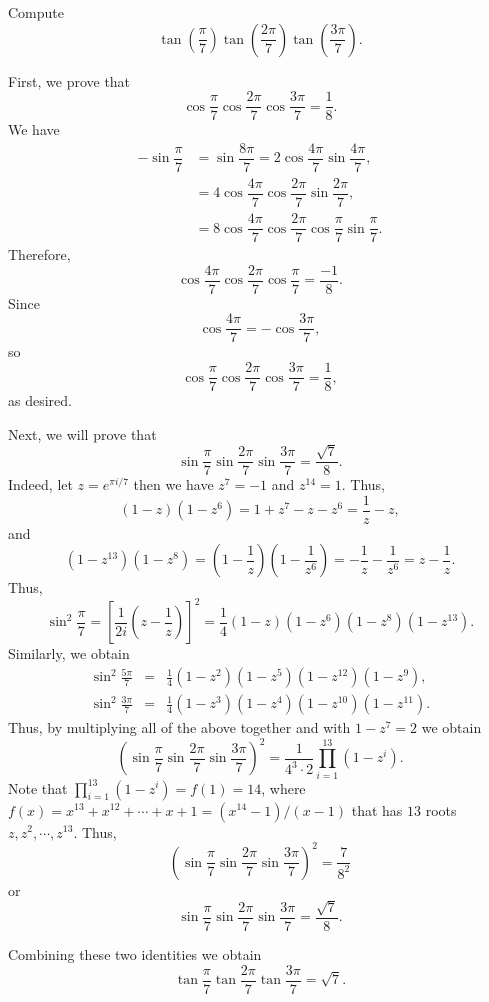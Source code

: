\documentclass[11pt]{article}
\theoremstyle{definition}
\begin{document}
%	








\begin{question}[name={2016 HMMT, Guts, \href{https://artofproblemsolving.com/community/c129h1359338p7444611}{Problem 15}}]
	Compute $$\tan\left(\frac{\pi}{7}\right)\tan\left(\frac{2\pi}{7}\right)\tan\left(\frac{3\pi}{7}\right).$$
\end{question}





\begin{solution}[name={Solution by shinichiman}]
	First, we prove that $$\cos \dfrac{\pi}{7} \cos \dfrac{2\pi}{7} \cos \dfrac{3\pi}{7}= \frac{1}{8}.$$ We have
	\begin{align*} -\sin \dfrac{\pi}{7} & = \sin \dfrac{8\pi}{7}= 2\cos \dfrac{4\pi}{7} \sin \dfrac{4\pi}{7}, \\
		& = 4 \cos \dfrac{4\pi}{7} \cos \dfrac{2\pi}{7} \sin \dfrac{2\pi}{7}, \\
		& = 8 \cos \dfrac{4\pi}{7} \cos \dfrac{2\pi}{7} \cos \dfrac{\pi}{7} \sin \dfrac{\pi}{7}. \end{align*}
	Therefore, $$\cos \dfrac{4\pi}{7} \cos \dfrac{2\pi}{7} \cos \dfrac{\pi}{7}= \dfrac{-1}{8}.$$ Since $$\cos \frac{4\pi}{7}= - \cos \dfrac{3\pi}{7},$$ so $$\cos \dfrac{\pi}{7} \cos \dfrac{2\pi}{7} \cos \dfrac{3\pi}{7}= \frac{1}{8},$$ as desired.
	
	
	Next, we will prove that $$\sin \frac{\pi}{7} \sin \frac{2\pi}{7} \sin \frac{3\pi}{7}= \frac{\sqrt{7}}{8}.$$ Indeed, let $z= e^{\pi i/7}$ then we have $z^7=-1$ and $z^{14}=1$. Thus, $$(1-z)(1-z^6)=1+z^7-z-z^6= \frac{1}{z}-z,$$ and $$(1-z^{13})(1-z^8)=\left(1- \frac 1z \right) \left(1- \frac{1}{z^6} \right)=-\frac{1}{z}- \frac{1}{z^6}=z- \frac{1}{z}.$$ Thus, $$\sin^2 \frac{\pi}{7}= \left[ \frac{1}{2i} \left(z- \frac{1}{z} \right) \right]^2=\frac 14(1-z)(1-z^6)(1-z^8)(1-z^{13}).$$Similarly, we obtain
	\begin{eqnarray*} \sin^2 \frac{5\pi}{7} & = & \frac 14 (1-z^2)(1-z^5)(1-z^{12})(1-z^{9}), \\
		\sin^2 \frac{3\pi}{7} & =& \frac 14 (1-z^3)(1-z^4)(1-z^{10})(1-z^{11}).
	\end{eqnarray*}
	Thus, by multiplying all of the above together and with $1-z^7=2$ we obtain
	$$\left( \sin \frac{\pi}{7} \sin \frac{2\pi}{7} \sin \frac{3\pi}{7} \right)^2= \frac{1}{4^3 \cdot 2} \prod_{i=1}^{13} (1-z^i).$$
	Note that $\prod_{i=1}^{13} (1-z^i)= f(1)=14$, where $f(x)=x^{13}+x^{12}+ \cdots + x+1= ({x^{14}-1})/({x-1})$ that has $13$ roots $z,z^2, \cdots , z^{13}$. Thus, $$\left( \sin \frac{\pi}{7} \sin \frac{2\pi}{7} \sin \frac{3\pi}{7} \right)^2= \frac{7}{8^2}$$ or $$ \sin \frac{\pi}{7} \sin \frac{2\pi}{7} \sin \frac{3\pi}{7} =\frac{\sqrt{7}}{8}.$$
	
	Combining these two identities we obtain $$\tan \frac{\pi}{7}\tan \frac{2\pi}{7}\tan \frac{3\pi}{7}= \sqrt{7}.$$
\end{solution}
\end{document}
